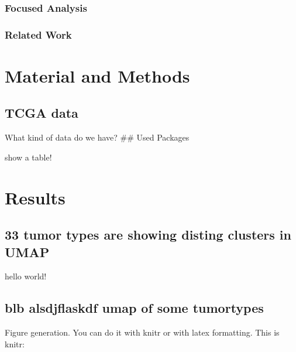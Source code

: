 \documentclass[
  parskip,
  oneside]{scrreprt}
\begin{document}
\hypertarget{focused-analysis}{%
\subsection{Focused Analysis}\label{focused-analysis}}

\hypertarget{related-work}{%
\subsection{Related Work}\label{related-work}}

\hypertarget{material-and-methods}{%
\chapter{Material and Methods}\label{material-and-methods}}

\hypertarget{tcga-data}{%
\section{TCGA data}\label{tcga-data}}

What kind of data do we have? \#\# Used Packages

show a table!

\hypertarget{results}{%
\chapter{Results}\label{results}}

\hypertarget{tumor-types-are-showing-disting-clusters-in-umap}{%
\section{33 tumor types are showing disting clusters in
UMAP}\label{tumor-types-are-showing-disting-clusters-in-umap}}

hello world!

\hypertarget{blb-alsdjflaskdf-umap-of-some-tumortypes}{%
\section{blb alsdjflaskdf umap of some
tumortypes}\label{blb-alsdjflaskdf-umap-of-some-tumortypes}}

Figure generation. You can do it with knitr or with latex formatting.
This is knitr:
\end{document}

